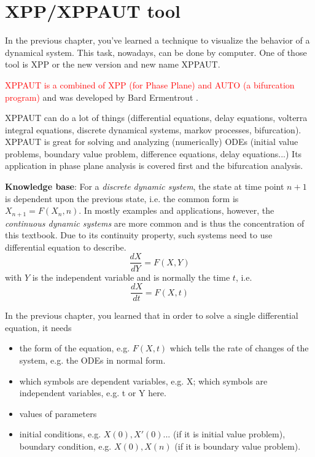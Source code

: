 
\chapter{XPP/XPPAUT tool}
\label{sec:xpp-tool}
\label{chap:XPPAUT}

In the previous chapter, you've learned a technique to visualize the
behavior of a dynamical system. This task, nowadays, can be done by
computer. One of those tool is XPP or the new version and new name XPPAUT.

\textcolor{red}{XPPAUT is a combined of XPP (for Phase Plane) and AUTO
  (a bifurcation program)} and was developed by Bard Ermentrout .
  
  
XPPAUT can do a lot of things (differential equations, delay
equations, volterra integral equations, discrete dynamical systems,
markov processes, bifurcation). XPPAUT is great for solving and
analyzing (numerically) ODEs (initial value problems, boundary value
problem, difference equations, delay equations...) Its application in
phase plane analysis is covered first and the bifurcation analysis.

{\bf Knowledge base}: For a {\it discrete dynamic system}, the state
at time point $n+1$ is dependent upon the previous state, i.e. the
common form is $X_{n+1} = F(X_n,n)$. In mostly examples and
applications, however, the {\it continuous dynamic systems} are more
common and is thus the concentration of this textbook. Due to its
continuity property, such systems need to use differential equation to
describe.
\begin{equation}
  \label{eq:121}
  \frac{dX}{dY}= F(X,Y)
\end{equation}
with $Y$ is the independent variable and is normally the time $t$,
i.e.
\begin{equation}
  \label{eq:349}
  \frac{dX}{dt}= F(X,t)
\end{equation}

In the previous chapter, you learned that in order to solve a
single differential equation, it needs
\begin{itemize}
\item the form of the equation, e.g. $F(X,t)$ which tells the rate of changes
of the system, e.g. the ODEs in normal form.


\item which symbols are dependent variables, e.g. X; which symbols are
  independent variables, e.g. t or Y here.

\item values of parameters

\item initial conditions, e.g. $X(0), X'(0)...$ (if it is initial
  value problem), boundary condition, e.g. $X(0), X(n)$ (if it is
  boundary value problem).

\end{itemize}

